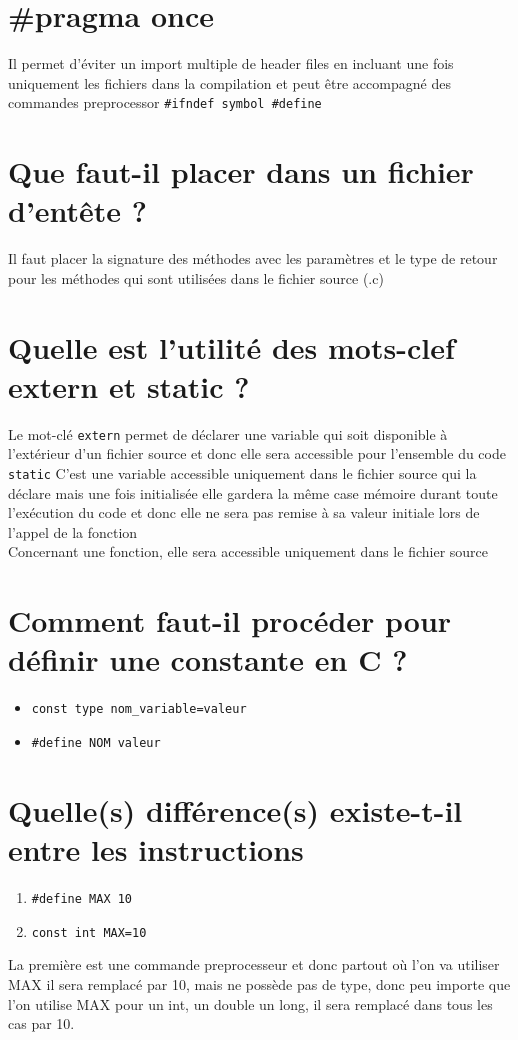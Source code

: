 \section{\#pragma once}
Il permet d'éviter un import multiple de header files en incluant une fois uniquement les fichiers dans la compilation et peut être accompagné des commandes preprocessor \texttt{\#ifndef symbol \#define}

\section{Que faut-il placer dans un fichier d'entête ?}
Il faut placer la signature des méthodes avec les paramètres et le type de retour pour les méthodes qui sont utilisées dans le fichier source (.c)

\section{Quelle est l'utilité des mots-clef extern et static ?}
Le mot-clé \texttt{extern} permet de déclarer une variable qui soit disponible à l'extérieur d'un fichier source et donc elle sera accessible pour l'ensemble du code
\texttt{static} C'est une variable accessible uniquement dans le fichier source qui la déclare mais une fois initialisée elle gardera la même case mémoire durant toute l'exécution du code et donc elle ne sera pas remise à sa valeur initiale lors de l'appel de la fonction\\
Concernant une fonction, elle sera accessible uniquement dans le fichier source

\section{Comment faut-il procéder pour définir une constante en C ?}
\begin{itemize}
   \item \texttt{const type nom\_variable=valeur}
   \item \texttt{\#define NOM valeur}
\end{itemize}

\section{Quelle(s) différence(s) existe-t-il entre les instructions}
\begin{enumerate}
   \item   \texttt{\#define MAX 10}
   \item \texttt{const int MAX=10}
\end{enumerate}
La première est une commande preprocesseur et donc partout où l'on va utiliser MAX il sera remplacé par 10, mais ne possède pas de type, donc peu importe que l'on utilise MAX pour un int, un double un long, il sera remplacé dans tous les cas par 10.\\

